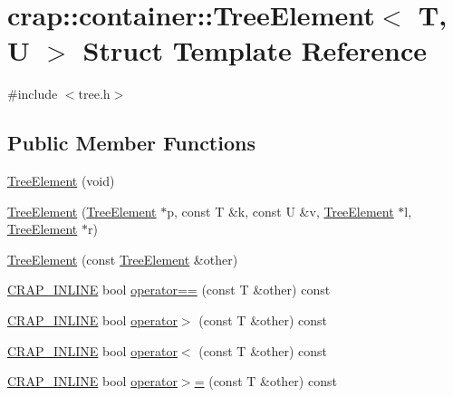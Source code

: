 \hypertarget{structcrap_1_1container_1_1_tree_element}{\section{crap\-:\-:container\-:\-:Tree\-Element$<$ T, U $>$ Struct Template Reference}
\label{structcrap_1_1container_1_1_tree_element}
}


{\ttfamily \#include $<$tree.\-h$>$}

\subsection*{Public Member Functions}
\begin{DoxyCompactItemize}
\item 
\hyperlink{structcrap_1_1container_1_1_tree_element_a650a4127a938025a19d14e81c29ca5fa}{Tree\-Element} (void)
\item 
\hyperlink{structcrap_1_1container_1_1_tree_element_a88c34bb20f14963748c0cb00d7200e46}{Tree\-Element} (\hyperlink{structcrap_1_1container_1_1_tree_element}{Tree\-Element} $\ast$p, const T \&k, const U \&v, \hyperlink{structcrap_1_1container_1_1_tree_element}{Tree\-Element} $\ast$l, \hyperlink{structcrap_1_1container_1_1_tree_element}{Tree\-Element} $\ast$r)
\item 
\hyperlink{structcrap_1_1container_1_1_tree_element_a654d50ca22d8018adced0edc667b32b8}{Tree\-Element} (const \hyperlink{structcrap_1_1container_1_1_tree_element}{Tree\-Element} \&other)
\item 
\hyperlink{compilers_8h_a5a40526b8d842e7ff731509998bb0f1c}{C\-R\-A\-P\-\_\-\-I\-N\-L\-I\-N\-E} bool \hyperlink{structcrap_1_1container_1_1_tree_element_a9aa8df13d3519e3526fe35d8b51aa33d}{operator==} (const T \&other) const 
\item 
\hyperlink{compilers_8h_a5a40526b8d842e7ff731509998bb0f1c}{C\-R\-A\-P\-\_\-\-I\-N\-L\-I\-N\-E} bool \hyperlink{structcrap_1_1container_1_1_tree_element_a6a18dbc3009fd68d9689ef696dbbed1e}{operator$>$} (const T \&other) const 
\item 
\hyperlink{compilers_8h_a5a40526b8d842e7ff731509998bb0f1c}{C\-R\-A\-P\-\_\-\-I\-N\-L\-I\-N\-E} bool \hyperlink{structcrap_1_1container_1_1_tree_element_a611b557160e8fe90caef8c900ec443ce}{operator$<$} (const T \&other) const 
\item 
\hyperlink{compilers_8h_a5a40526b8d842e7ff731509998bb0f1c}{C\-R\-A\-P\-\_\-\-I\-N\-L\-I\-N\-E} bool \hyperlink{structcrap_1_1container_1_1_tree_element_a8d467b4d638d70d227317e2c04b12f5b}{operator$>$=} (const T \&other) const 

\end{DoxyCompactItemize}
